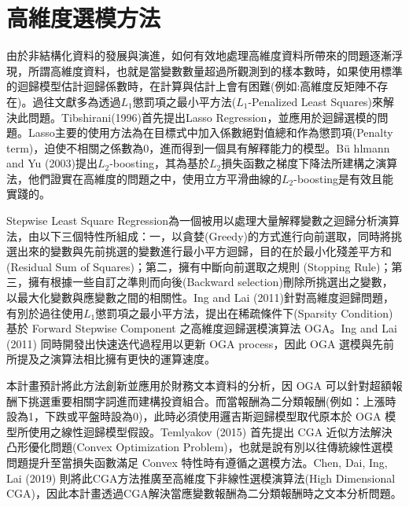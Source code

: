 \section{高維度選模方法}
由於非結構化資料的發展與演進，如何有效地處理高維度資料所帶來的問題逐漸浮現，所謂高維度資料，也就是當變數數量超過所觀測到的樣本數時，如果使用標準的迴歸模型估計迴歸係數時，在計算與估計上會有困難(例如:高維度反矩陣不存在)。過往文獻多為透過$L_1$懲罰項之最小平方法($L_1$-Penalized Least Squares)來解決此問題。Tibshirani(1996)首先提出Lasso Regression，並應用於迴歸選模的問題。Lasso主要的使用方法為在目標式中加入係數絕對值總和作為懲罰項(Penalty term)，迫使不相關之係數為0，進而得到一個具有解釋能力的模型。Bü hlmann and Yu (2003)提出$L_2$-boosting，其為基於$L_2$損失函數之梯度下降法所建構之演算法，他們證實在高維度的問題之中，使用立方平滑曲線的$L_2$-boosting是有效且能實踐的。

Stepwise Least Square Regression為一個被用以處理大量解釋變數之迴歸分析演算法，由以下三個特性所組成：一，以貪婪(Greedy)的方式進行向前選取，同時將挑選出來的變數與先前挑選的變數進行最小平方迴歸，目的在於最小化殘差平方和(Residual Sum of Squares)；第二，擁有中斷向前選取之規則 (Stopping Rule)；第三，擁有根據一些自訂之準則而向後(Backward selection)刪除所挑選出之變數，以最大化變數與應變數之間的相關性。Ing and Lai (2011)針對高維度迴歸問題，有別於過往使用$L_1$懲罰項之最小平方法，提出在稀疏條件下(Sparsity Condition)基於 Forward Stepwise Component 之高維度迴歸選模演算法 OGA。Ing and Lai (2011) 同時開發出快速迭代過程用以更新 OGA process，因此 OGA 選模與先前所提及之演算法相比擁有更快的運算速度。

本計畫預計將此方法創新並應用於財務文本資料的分析，因 OGA 可以針對超額報酬下挑選重要相關字詞進而建構投資組合。而當報酬為二分類報酬(例如：上漲時設為1，下跌或平盤時設為0)，此時必須使用邏吉斯迴歸模型取代原本於 OGA 模型所使用之線性迴歸模型假設。Temlyakov (2015) 首先提出 CGA 近似方法解決凸形優化問題(Convex Optimization Problem)，也就是說有別以往傳統線性選模問題提升至當損失函數滿足 Convex 特性時有遵循之選模方法。Chen, Dai, Ing, Lai (2019)
則將此CGA方法推廣至高維度下非線性選模演算法(High Dimensional CGA)，因此本計畫透過CGA解決當應變數報酬為二分類報酬時之文本分析問題。
